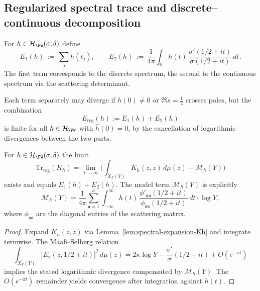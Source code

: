 \subsection{Regularized spectral trace and discrete–continuous decomposition}
\label{subsec:ch4-part3-reg-trace} \relax

\begin{definition}
\label{def:E1E2}
For $h\in\mathcal{H}_{\PW}(\sigma,\delta)$ define
\[
E_1(h)\,:=\,\sum_{j} h(t_j),
\qquad
E_2(h)\,:=\,\frac{1}{4\pi}\int_{\mathbb{R}} h(t)\,\frac{\sigma'(1/2+it)}{\sigma(1/2+it)}\,dt.
\]
The first term corresponds to the discrete spectrum, the second to the continuous spectrum via the scattering determinant.
\end{definition}

\begin{remark}[Regularization]
Each term separately may diverge if $h(0)\neq 0$ or $\Re s=\tfrac12$ crosses poles, but the combination
\[
E_{\mathrm{reg}}(h):=E_1(h)+E_2(h)
\]
is finite for all $h\in\mathcal{H}_{\PW}$ with $\widehat{h}(0)=0$, by the cancellation of logarithmic divergences between the two parts. \relax
\end{remark}

\begin{lemma}
\label{lem:existence-regtrace}
For $h\in\mathcal{H}_{\PW}(\sigma,\delta)$ the limit
\[
\mathrm{Tr}_{\mathrm{reg}}(K_h)
=\lim_{Y\to\infty}\Big(\int_{X_\Gamma(Y)} K_h(z,z)\,d\mu(z)-\mathcal{M}_h(Y)\Big)
\]
exists and equals $E_1(h)+E_2(h)$. The model term $\mathcal{M}_h(Y)$ is explicitly
\[
\mathcal{M}_h(Y)=\frac{1}{4\pi}\sum_{\mathfrak a=1}^{\kappa}\int_{-\infty}^{\infty}h(t)\,\frac{\phi'_{\mathfrak a\mathfrak a}(1/2+it)}{\phi_{\mathfrak a\mathfrak a}(1/2+it)}\,dt\cdot \log Y,
\]
where $\phi_{\mathfrak a\mathfrak a}$ are the diagonal entries of the scattering matrix.
\end{lemma}

\begin{proof}\relax
Expand $K_h(z,z)$ via Lemma~\ref{lem:spectral-expansion-Kh} and integrate termwise.
The Maaß–Selberg relation
\[
\int_{X_\Gamma(Y)} |E_{\mathfrak a}(z,1/2+it)|^2\,d\mu(z)
=2\kappa\log Y - \frac{\sigma'}{\sigma}(1/2+it)+O(e^{-\pi t})
\]
implies the stated logarithmic divergence compensated by $\mathcal{M}_h(Y)$. The $O(e^{-\pi t})$ remainder yields convergence after integration against $h(t)$. \relax
\end{proof}

